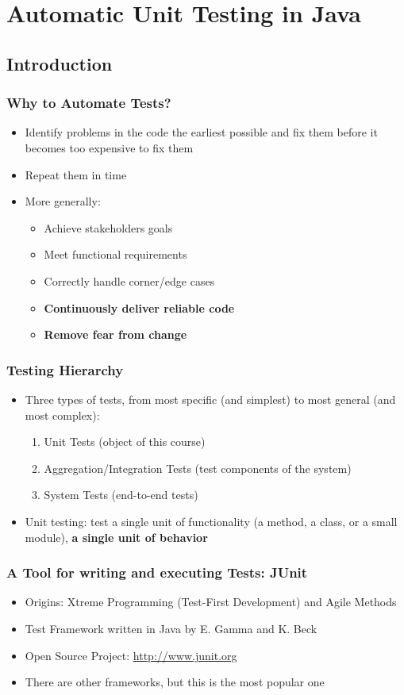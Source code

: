 \documentclass{beamer}
\begin{document}
\section{Automatic Unit Testing in Java}

\subsection{Introduction}

\begin{frame}
\frametitle{Why to Automate Tests?}
\begin{itemize}
\item Identify problems in the code the earliest possible and fix them
  before it becomes too expensive to fix them
\item Repeat them in time
\item More generally:
  \begin{itemize}
  \item Achieve stakeholders goals
  \item Meet functional requirements
  \item Correctly handle corner/edge cases
  \item \textbf{Continuously deliver reliable code}
  \item \textbf{Remove fear from change}
  \end{itemize}    
\end{itemize}
\end{frame}

\begin{frame}
\frametitle{Testing Hierarchy}
\begin{itemize}
\item Three types of tests, from most specific (and simplest) to most general (and most complex):
  \begin{enumerate}
  \item Unit Tests (object of this course)
  \item Aggregation/Integration Tests (test components of the system)
  \item System Tests (end-to-end tests)
  \end{enumerate}
\item Unit testing: test a single unit of functionality (a method, a
  class, or a small module), \textbf{a single unit of behavior}
\end{itemize}
\end{frame}

\begin{frame}
\frametitle{A Tool for writing and executing Tests: JUnit}
\begin{itemize}
\item Origins: Xtreme Programming (Test-First Development) and Agile Methods
\item Test Framework written in Java by E. Gamma and K. Beck
\item Open Source Project: \url{http://www.junit.org}
\item There are other frameworks, but this is the most popular one
\end{itemize}
\end{frame}
\end{document}
